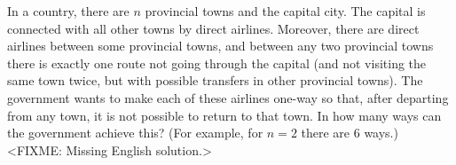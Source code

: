 \problem
In a country, there are $n$ provincial towns and the capital city.
The capital is connected with all other towns by direct airlines.
Moreover, there are direct airlines between some provincial towns, and between
any two provincial towns there is exactly one route not going through the
capital (and not visiting the same town twice, but with possible transfers in
other provincial towns).
The government wants to make each of these airlines one-way so that, after
departing from any town, it is not possible to return to that town.
In how many ways can the government achieve this?
(For example, for $n = 2$ there are $6$ ways.)
\solution
<FIXME: Missing English solution.>
\endproblem
